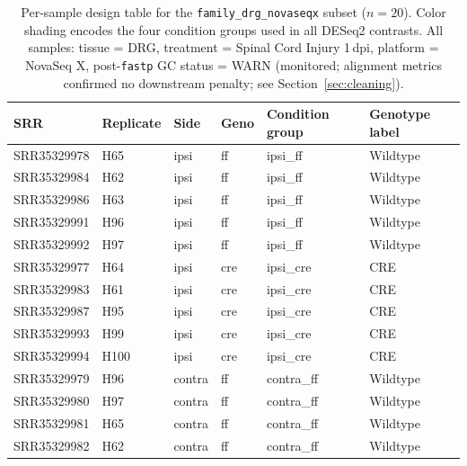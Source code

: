 \documentclass[12pt]{article}
\begin{document}
\begin{table}[H]
\centering
\small
\caption{Per-sample design table for the \texttt{family\_drg\_novaseqx} subset
  ($n = 20$). Color shading encodes the four condition groups used in all DESeq2 contrasts.
  All samples: tissue = DRG, treatment = Spinal Cord Injury 1\,dpi, platform = NovaSeq X,
  post-\texttt{fastp} GC status = WARN (monitored; alignment metrics confirmed no downstream
  penalty; see Section~\ref{sec:cleaning}).}
\label{tab:design_table}
\begin{tabularx}{\textwidth}{l l >{\centering\arraybackslash}p{1.6cm}
                              >{\centering\arraybackslash}p{1.6cm}
                              >{\centering\arraybackslash}p{2.2cm} Y}
\toprule
{}
\textbf{SRR} & \textbf{Replicate} & \textbf{Side} & \textbf{Geno} &
\textbf{Condition group} & \textbf{Genotype label} \\
\midrule
{}
SRR35329978 & H65  & ipsi  & ff  & ipsi\_ff  & Wildtype \\
SRR35329984 & H62  & ipsi  & ff  & ipsi\_ff  & Wildtype \\
SRR35329986 & H63  & ipsi  & ff  & ipsi\_ff  & Wildtype \\
SRR35329991 & H96  & ipsi  & ff  & ipsi\_ff  & Wildtype \\
SRR35329992 & H97  & ipsi  & ff  & ipsi\_ff  & Wildtype \\
\midrule
{}
SRR35329977 & H64  & ipsi  & cre & ipsi\_cre & CRE \\
SRR35329983 & H61  & ipsi  & cre & ipsi\_cre & CRE \\
SRR35329987 & H95  & ipsi  & cre & ipsi\_cre & CRE \\
SRR35329993 & H99  & ipsi  & cre & ipsi\_cre & CRE \\
SRR35329994 & H100 & ipsi  & cre & ipsi\_cre & CRE \\
\midrule
{}
SRR35329979 & H96  & contra & ff  & contra\_ff & Wildtype \\
SRR35329980 & H97  & contra & ff  & contra\_ff & Wildtype \\
SRR35329981 & H65  & contra & ff  & contra\_ff & Wildtype \\
SRR35329982 & H62  & contra & ff  & contra\_ff & Wildtype \\

\end{tabularx}
\end{table}
\end{document}
